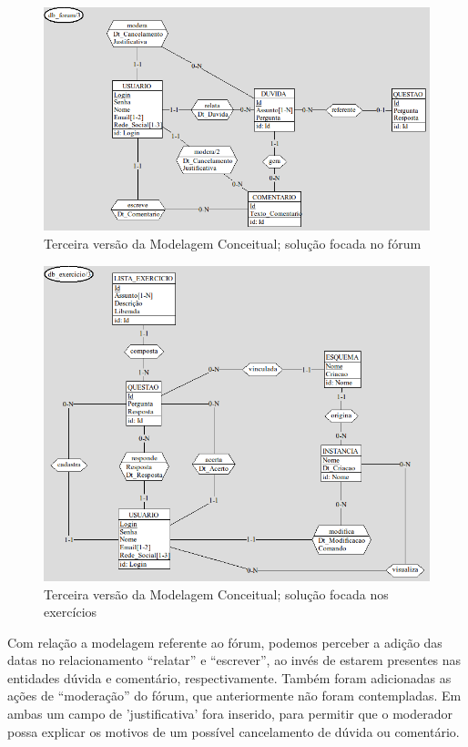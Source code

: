 \documentclass[graduacao,brazil]{ThesisPUC}
\begin{document}
\begin{figure}[H]
    \centering
    \includegraphics[width=\linewidth]{Imagens/ModelagemConceitual_forum_v2_0.png}
    \caption{Terceira vers\~{a}o da Modelagem Conceitual; solu\c{c}\~{a}o focada no f\'{o}rum}
\end{figure}

\begin{figure}[H]
    \centering
    \includegraphics[width=\linewidth]{Imagens/ModelagemConceitual_exercicio_v2_0.png}
    \caption{Terceira vers\~{a}o da Modelagem Conceitual; solu\c{c}\~{a}o focada nos exerc\'{i}cios}
\end{figure}

Com rela\c{c}\~{a}o a modelagem referente ao f\'{o}rum, podemos perceber a adi\c{c}\~{a}o das datas no
relacionamento “relatar” e “escrever”, ao inv\'{e}s de estarem presentes nas entidades d\'{u}vida e
coment\'{a}rio, respectivamente. Tamb\'{e}m foram adicionadas as a\c{c}\~{o}es de “modera\c{c}\~{a}o” do f\'{o}rum,
que anteriormente n\~{a}o foram contempladas. Em ambas um campo de 'justificativa' fora inserido,
para permitir que o moderador possa explicar os motivos de um poss\'{i}vel cancelamento de d\'{u}vida
ou coment\'{a}rio.
\end{document}
